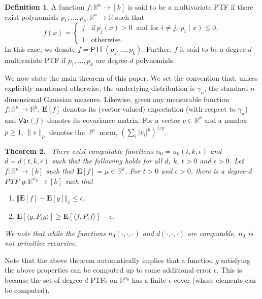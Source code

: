 \documentclass[11pt]{article}
\numberwithin{equation}{section}
\newtheorem{theorem}{Theorem}[section]
\theoremstyle{definition}
\newtheorem{definition}[theorem]{Definition}
\theoremstyle{plain}
\newcommand{\R}{\mathbb R}
\begin{document}
\begin{definition}
A function $f: \mathbb{R}^n \rightarrow [k]$ is said to be a multivariate PTF
if there exist polynomials $p_1, \ldots, p_k : \mathbb{R}^n \rightarrow
\mathbb{R}$ such that 
$$
f(x) = \begin{cases}
j  & \textrm{if} \  p_j(x)>0 \ \textrm{ and  for } i \neq j, \  p_{i}(x) \le 0, \\
1 & \textrm{otherwise.}\end{cases}
$$
In this case, we denote $f = \mathsf{PTF}(p_1, \ldots, p_k)$. Further, $f$ is said to be a degree-$d$ multivariate PTF if   $p_1, \ldots, p_k$ are  degree-$d$ polynomials.
\end{definition}
We now state the main theorem of this paper. We set the convention that, unless
explicitly mentioned otherwise, the underlying distribution is $\gamma_n$, the
standard $n$-dimensional Gaussian measure. 
Likewise, given any measurable function $f: \R^n \to \R^k$, $\mathbf{E}[f]$ denotes its (vector-valued) expectation (with respect to $\gamma_n$) and $\mathsf{Var}(f)$ denotes its covariance matrix.  
For a vector $v \in \R^k$ and a number $p \ge 1$, $\|v\|_p$ denotes the
$\ell^p$ norm, $(\sum_i |v_i|^p)^{1/p}$.


\begin{theorem}~\label{thm:main-stab}
There exist computable functions $n_0 = n_0(t, k, \epsilon)$ and $d= d(t, k, \epsilon)$ such that the following holds for all $d$, $k$, $t>0$ and $\epsilon>0$. 
Let $f: \mathbb{R}^n \rightarrow [k]$ such that $\mathbf{E}[f] = \mu \in \mathbb{R}^k$. For $t>0$ and $\epsilon>0$,  there is a degree-$d$ PTF $g: \mathbb{R}^{n_0} \rightarrow [k]$ such that 
\begin{enumerate}
\item $\Vert \mathbf{E}[f] - \mathbf{E}[g] \Vert_1 \le \epsilon$, 
\item $\mathbf{E}[\langle g, P_t g \rangle] \ge \mathbf{E}[\langle f, P_t f \rangle] - \epsilon$.
\end{enumerate}
%
We note  %
that while the functions $n_0(\cdot, \cdot, \cdot)$ and $d(\cdot, \cdot, \cdot)$ are computable, $n_0$ is not primitive recursive.
\end{theorem}


Note that the above theorem automatically implies that a function $g$ satisfying the above properties can be  computed up to some additional error $\epsilon$. This is because the set of degree-$d$ PTFs on $\mathbb{R}^{n_0}$ has a finite $\epsilon$-cover (whose elements 
can be computed). 
\end{document}
